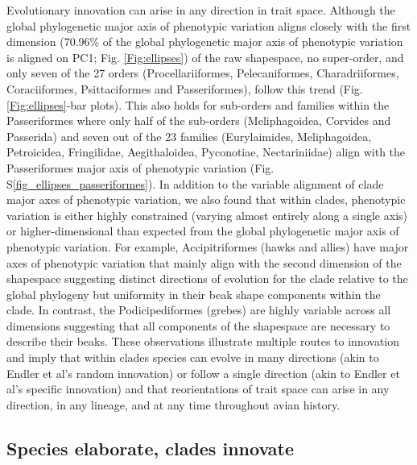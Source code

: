 \documentclass[12pt,letterpaper]{article}
\begin{document}
Evolutionary innovation can arise in any direction in trait space.
Although the global phylogenetic major axis of phenotypic variation aligns closely with the first dimension (70.96\% of the global phylogenetic major axis of phenotypic variation is aligned on PC1; Fig. \ref{Fig:ellipses}) of the raw shapespace, no super-order, and only seven of the 27 orders (Procellariiformes, Pelecaniformes, Charadriiformes, Coraciiformes, Psittaciformes and Passeriformes), follow this trend (Fig. \ref{Fig:ellipses}-bar plots).
This also holds for sub-orders and families within the Passeriformes where only half of the sub-orders (Meliphagoidea, Corvides and Passerida) and seven out of the 23 families (Eurylaimides, Meliphagoidea, Petroicidea, Fringilidae, Aegithaloidea, Pyconotiae, Nectariniidae) align with the Passeriformes major axis of phenotypic variation (Fig. S\ref{fig_ellipses_passeriformes}).
In addition to the variable alignment of clade major axes of phenotypic variation, we also found that within clades, phenotypic variation is either highly constrained (varying almost entirely along a single axis) or higher-dimensional than expected from the global phylogenetic major axis of phenotypic variation.
For example, Accipitriformes (hawks and allies) have major axes of phenotypic variation that mainly align with the second dimension of the shapespace suggesting distinct directions of evolution for the clade relative to the global phylogeny but uniformity in their beak shape components within the clade.
In contrast, the Podicipediformes (grebes) are highly variable across all dimensions suggesting that all components of the shapespace are necessary to describe their beaks.
These observations illustrate multiple routes to innovation and imply that within clades species can evolve in many directions (akin to Endler et al's random innovation) or follow a single direction (akin to Endler et al's specific innovation) and that reorientations of trait space can arise in any direction, in any lineage, and at any time throughout avian history.


\subsection{Species elaborate, clades innovate}

\end{document}
